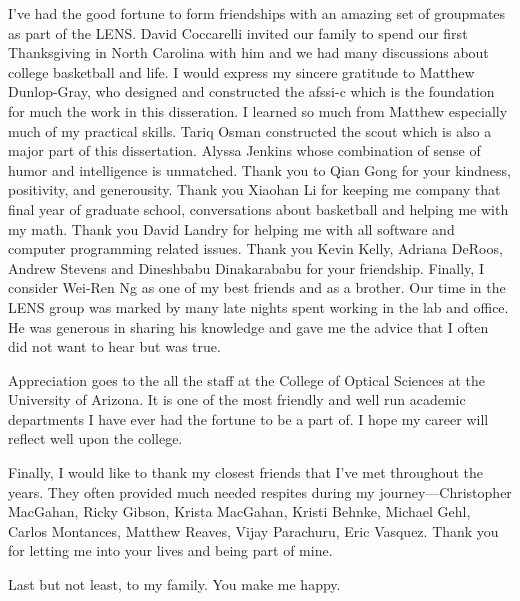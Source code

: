 I've had the good fortune to form friendships with an amazing set of groupmates as part of the \gls{LENS}. David Coccarelli invited our family to spend our first Thanksgiving in North Carolina with him and we had many discussions about college basketball and life. I would express my sincere gratitude to Matthew Dunlop-Gray, who designed and constructed the \gls{afssi-c} which is the foundation for much the work in this disseration. I learned so much from Matthew especially much of my practical skills. Tariq Osman constructed the \gls{scout} which is also a major part of this dissertation. Alyssa Jenkins whose combination of sense of humor and intelligence is unmatched. Thank you to Qian Gong for your kindness, positivity, and generousity. Thank you Xiaohan Li for keeping me company that final year of graduate school, conversations about basketball and helping me with my math. Thank you David Landry for helping me with all software and computer programming related issues. Thank you Kevin Kelly, Adriana DeRoos, Andrew Stevens and Dineshbabu Dinakarababu for your friendship. Finally, I consider Wei-Ren Ng as one of my best friends and as a brother. Our time in the \gls{LENS} group was marked by many late nights spent working in the lab and office. He was generous in sharing his knowledge and gave me the advice that I often did not want to hear but was true. 

Appreciation goes to the all the staff at the College of Optical Sciences at the University of Arizona. It is one of the most friendly and well run academic departments I have ever had the fortune to be a part of. I hope my career will reflect well upon the college. 

Finally, I would like to thank my closest friends that I've met throughout the years. They often provided much needed respites during my journey---Christopher MacGahan, Ricky Gibson, Krista MacGahan, Kristi Behnke, Michael Gehl, Carlos Montances, Matthew Reaves, Vijay Parachuru, Eric Vasquez. Thank you for letting me into your lives and being part of mine.

Last but not least, to my family. You make me happy. 